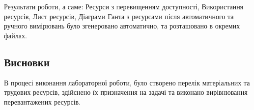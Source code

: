 Результати роботи, а саме: Ресурси з перевищенням доступності, Використання ресурсів, Лист ресурсів, Діаграми Ганта з ресурсами після автоматичного та ручного вимірювань було згенеровано автоматично, та розташовано в окремих файлах.

\subsection*{Висновки}
В процесі виконання лабораторної роботи, було створено
перелік матеріальних та трудових ресурсів, здійснено їх призначення на задачі та виконано вирівнювання перевантажених ресурсів.


